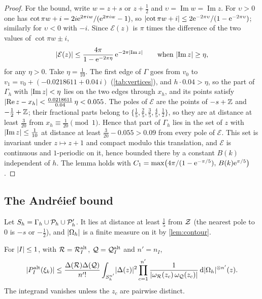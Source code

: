 \begin{proof}
For the bound, write $w=z+s$ or $z+\frac12$ and $\upsilon=\operatorname{Im}w=\operatorname{Im}z$.
For $\upsilon>0$ one has $\cot\pi w+i=2i\mathrm{e}^{2\pi iw}/(\mathrm{e}^{2\pi iw}-1)$, so
$\lvert \cot\pi w+i\rvert\le2\mathrm{e}^{-2\pi\upsilon}/(1-\mathrm{e}^{-2\pi\upsilon})$; similarly for $\upsilon<0$ with
$-i$. Since $\mathcal E(z)$ is $\pi$ times the difference of the two values of $\cot\pi w\pm i$,
\[
  \lvert \mathcal E(z)\rvert\le\frac{4\pi}{1-\mathrm{e}^{-2\pi\eta}}\,\mathrm{e}^{-2\pi\lvert \operatorname{Im}z\rvert}
  \qquad\text{when }\lvert \operatorname{Im}z\rvert\ge\eta,
\]
for any $\eta>0$. Take $\eta=\frac1{10}$. The first edge of $\Gamma$ goes from $v_0$ to
$v_1=v_0+(-0.0218611+0.04\,i)$ (\cref{tab:vertices}), and $h\cdot0.04>\eta$, so the part of
$\Gamma_h$ with $\lvert \operatorname{Im}z\rvert<\eta$ lies on the two edges through $x_h$, and its points
satisfy $\lvert \operatorname{Re}z-x_h\rvert<\frac{0.0218611}{0.04}\,\eta<0.055$. The poles of $\mathcal E$
are the points of $-s+\mathbb{Z}$ and $-\frac12+\mathbb{Z}$; their fractional parts belong to
$\{\frac15,\frac25,\frac35,\frac45,\frac12\}$, so they are at distance at least $\frac3{20}$ from
$x_h\equiv\frac1{20}\pmod1$. Hence that part of $\Gamma_h$ lies in the set of $z$ with
$\lvert \operatorname{Im}z\rvert\le\frac1{10}$ at distance at least $\frac3{20}-0.055>0.09$ from every pole
of $\mathcal E$. This set is invariant under $z\mapsto z+1$ and compact modulo this translation,
and $\mathcal E$ is continuous and $1$-periodic on it, hence bounded there by a constant $B(k)$
independent of $h$. The lemma holds with $C_1=\max\bigl(4\pi/(1-\mathrm{e}^{-\pi/5}),\,B(k)\mathrm{e}^{\pi/5}\bigr)$.
\end{proof}

\subsection{The Andr\'eief bound}\label{subsec:andreief-bound}

Let $S_h=\Gamma_h\cup\mathcal{P}_h\cup\mathcal{P}'_h$. It lies at distance at least $\frac15$ from $\mathcal{Z}$
(the nearest pole to $0$ is $-s$ or $-\frac12$), and $\lvert \Omega_h\rvert$ is a finite measure on it
by \cref{lem:contour}.

\begin{lemma}\label{lem:andreief-bound}
For $\lvert I\rvert\le1$, with $\mathcal{R}=\mathcal{R}^{\mathrm{alt}}_I$, $\mathcal{Q}=\mathcal{Q}^{\mathrm{alt}}_I$ and $n'=n_I$,
\[
  \lvert P^{\mathrm{alt}}_I(\xi_k)\rvert\le\frac{\Delta(\mathcal{R})\Delta(\mathcal{Q})}{n'!}\int_{S_h^{n'}}
  \lvert \Delta(z)\rvert^2\prod_{c=1}^{n'}\frac1{\lvert \omega_{\mathcal{R}}(z_c)\,\omega_{\mathcal{Q}}(z_c)\rvert}\,
  \mathrm{d}\lvert \Omega_h\rvert^{\otimes n'}(z).
\]
The integrand vanishes unless the $z_c$ are pairwise distinct.
\end{lemma}

